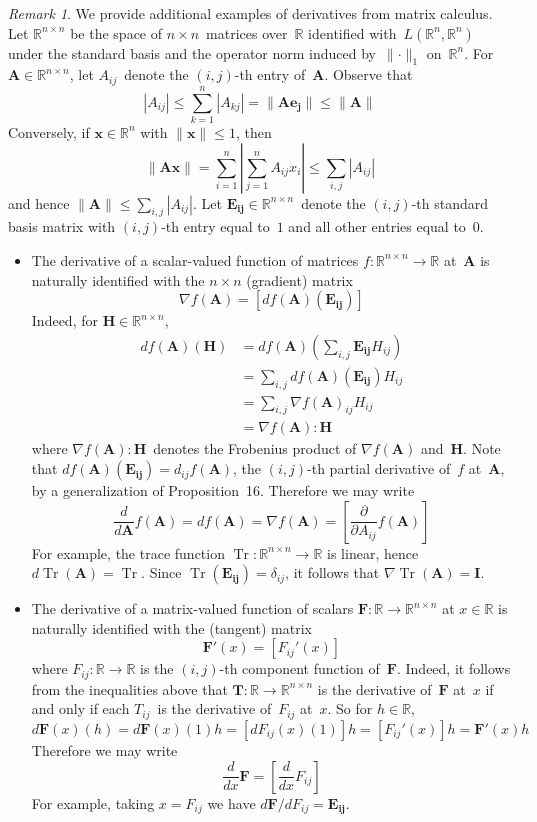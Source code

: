 \documentclass[letterpaper,12pt]{article}
\newcommand{\R}{\mathbb{R}}
\newcommand{\grad}{\nabla}
\newcommand{\fprod}{:}
\newcommand{\df}{d\!f}
\DeclareMathOperator{\Tr}{Tr}
\newcommand{\abs}[1]{|{#1}|}
\newcommand{\bigabs}[1]{\left|{#1}\right|}
\newcommand{\norm}[1]{\lVert{#1}\rVert}
\renewcommand{\vec}[1]{\boldsymbol{#1}}
\newcommand{\mat}[1]{\boldsymbol{#1}}
\theoremstyle{plain}
\theoremstyle{definition}
\theoremstyle{remark}
\newtheorem*{rmk}{Remark}
\begin{document}
\begin{rmk}
We provide additional examples of derivatives from matrix calculus. Let \(\R^{n\times n}\) be the space of \(n\times n\)~matrices over~\(\R\) identified with~\(L(\R^n,\R^n)\) under the standard basis and the operator norm induced by~\(\norm{\cdot}_1\) on~\(\R^n\). For \(\mat{A}\in\R^{n\times n}\), let \(A_{ij}\)~denote the \((i,j)\)-th entry of~\(\mat{A}\). Observe that
\[\abs{A_{ij}}\le\sum_{k=1}^n\abs{A_{kj}}=\norm{\mat{A}\vec{e_j}}\le\norm{\mat{A}}\]
Conversely, if \(\vec{x}\in\R^n\) with \(\norm{\vec{x}}\le 1\), then
\[\norm{\mat{A}\vec{x}}=\sum_{i=1}^n\bigabs{\sum_{j=1}^n A_{ij}x_i}\le\sum_{i,j}\abs{A_{ij}}\]
and hence \(\norm{\mat{A}}\le\sum_{i,j}\abs{A_{ij}}\). Let \(\mat{E_{ij}}\in\R^{n\times n}\)~denote the \((i,j)\)-th standard basis matrix with \((i,j)\)-th entry equal to~\(1\) and all other entries equal to~\(0\).
\begin{itemize}
\item The derivative of a scalar-valued function of matrices \(f:\R^{n\times n}\to\R\) at~\(\mat{A}\) is naturally identified with the \(n\times n\) (gradient) matrix
\[\grad f(\mat{A})=[\df(\mat{A})(\mat{E_{ij}})]\]
Indeed, for \(\mat{H}\in\R^{n\times n}\),
\begin{align*}
\df(\mat{A})(\mat{H})&=\df(\mat{A})(\sum_{i,j}\mat{E_{ij}}H_{ij})\\
	&=\sum_{i,j}\df(\mat{A})(\mat{E_{ij}})H_{ij}\\
	&=\sum_{i,j}\grad f(\mat{A})_{ij}H_{ij}\\
	&=\grad f(\mat{A})\fprod\mat{H}
\end{align*}
where \(\grad f(\mat{A})\fprod\mat{H}\)~denotes the Frobenius product of \(\grad f(\mat{A})\) and~\(\mat{H}\). Note that \(\df(\mat{A})(\mat{E_{ij}})=d_{ij}f(\mat{A})\), the \((i,j)\)-th partial derivative of~\(f\) at~\(\mat{A}\), by a generalization of Proposition~16. Therefore we may write
\[\frac{d}{d\mat{A}}f(\mat{A})=\df(\mat{A})=\grad f(\mat{A})=\left[\frac{\partial}{\partial A_{ij}}f(\mat{A})\right]\]
For example, the trace function \(\Tr:\R^{n\times n}\to\R\) is linear, hence \(d\Tr(\mat{A})=\Tr\). Since \(\Tr(\mat{E_{ij}})=\delta_{ij}\), it follows that \(\grad\Tr(\mat{A})=\mat{I}\).
\item The derivative of a matrix-valued function of scalars \(\mat{F}:\R\to\R^{n\times n}\) at \(x\in\R\) is naturally identified with the (tangent) matrix
\[\mat{F'}(x)=[F_{ij}'(x)]\]
where \(F_{ij}:\R\to\R\) is the \((i,j)\)-th component function of~\(\mat{F}\). Indeed, it follows from the inequalities above that \(\mat{T}:\R\to\R^{n\times n}\) is the derivative of~\(\mat{F}\) at~\(x\) if and only if each \(T_{ij}\)~is the derivative of~\(F_{ij}\) at~\(x\). So for \(h\in\R\),
\[d\mat{F}(x)(h)=d\mat{F}(x)(1)h=[dF_{ij}(x)(1)]h=[F_{ij}'(x)]h=\mat{F'}(x)h\]
Therefore we may write
\[\frac{d}{dx}\mat{F}=\left[\frac{d}{dx}F_{ij}\right]\]
For example, taking \(x=F_{ij}\) we have \(d\mat{F}/dF_{ij}=\mat{E_{ij}}\).
\end{itemize}
\end{rmk}
\end{document}

